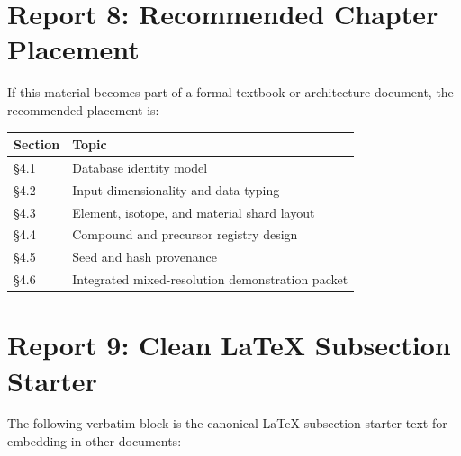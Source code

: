 \documentclass[11pt, a4paper, oneside]{article}
\begin{document}
\section{Report 8: Recommended Chapter Placement}
\label{sec:report8}

If this material becomes part of a formal textbook or architecture document, the
recommended placement is:

\begin{center}
\begin{tabular}{@{} l l @{}}
\toprule
\textbf{Section} & \textbf{Topic}\\
\midrule
§4.1 & Database identity model\\
§4.2 & Input dimensionality and data typing\\
§4.3 & Element, isotope, and material shard layout\\
§4.4 & Compound and precursor registry design\\
§4.5 & Seed and hash provenance\\
§4.6 & Integrated mixed-resolution demonstration packet\\
\bottomrule
\end{tabular}
\end{center}


\section{Report 9: Clean \LaTeX{} Subsection Starter}
\label{sec:report9}

The following verbatim block is the canonical \LaTeX{} subsection starter text
for embedding in other documents:
\end{document}
